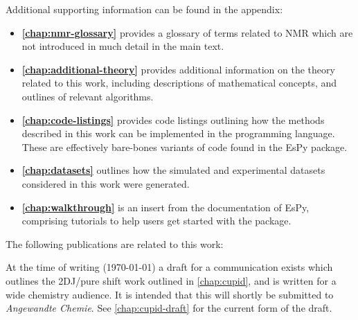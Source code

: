 Additional supporting information can be found in the appendix:
\begin{itemize}
    \item \textbf{\cref{chap:nmr-glossary}} provides a glossary of terms
        related to \ac{NMR} which are not introduced in much detail in the main
        text.
    \item \textbf{\cref{chap:additional-theory}} provides additional
        information on the theory related to this work, including descriptions
        of mathematical concepts, and outlines of relevant algorithms.
    \item \textbf{\cref{chap:code-listings}} provides code listings outlining
        how the methods described in this work can be implemented in the
        \Python programming language.
        These are effectively bare-bones variants of code found in the
        \ac{EsPy} package.
    \item \textbf{\cref{chap:datasets}} outlines how the simulated and
        experimental datasets considered in this work were generated.
    \item \textbf{\cref{chap:walkthrough}} is an insert from the documentation
        of \ac{EsPy}, comprising tutorials to help users get started with the
        package.
\end{itemize}

The following publications are related to this work:


At the time of writing (\today) a draft for a communication exists which
outlines the \ac{2DJ}/pure shift work outlined in \cref{chap:cupid}, and is
written for a wide chemistry audience.  It is intended that this will shortly
be submitted to \textit{Angewandte Chemie}.  See \cref{chap:cupid-draft} for
the current form of the draft.

